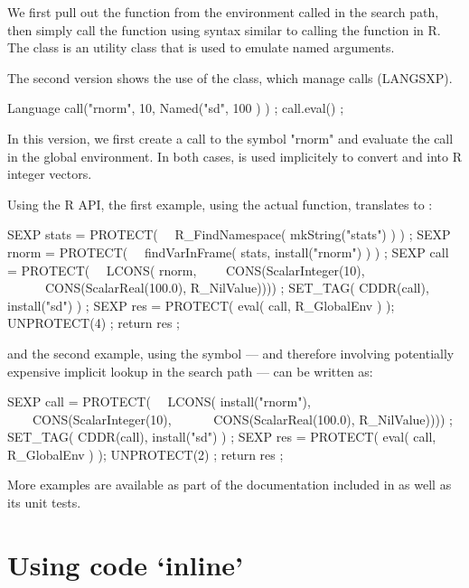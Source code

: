 We first pull out the  function from the environment 
called  in the search path, then simply call the function 
using syntax similar to calling the function in R. The  
class is an utility class that is used to emulate named arguments.

The second version shows the use of the  class, which 
manage calls (LANGSXP). 

\begin{example}
Language call("rnorm", 10, Named("sd", 100 ) ) ;
call.eval() ;
\end{example}

In this version, we first create a call to the symbol "rnorm" and
evaluate the call in the global environment. In both cases, 
is used implicitely to convert  and  
into R integer vectors. 

Using the R API, the first example, using the actual  function,
translates to :

\begin{example}
SEXP stats = PROTECT( 
\ \ R_FindNamespace( mkString("stats") ) ) ;
SEXP rnorm = PROTECT( 
\ \ findVarInFrame( stats, install("rnorm") ) ) ;
SEXP call  = PROTECT( 
\ \ LCONS( rnorm, 
\ \ \ \ CONS(ScalarInteger(10), 
\ \ \ \ \ \ CONS(ScalarReal(100.0), R_NilValue)))) ;
SET_TAG( CDDR(call), install("sd") ) ;
SEXP res = PROTECT( eval( call, R_GlobalEnv ) );
UNPROTECT(4) ;
return res ;
\end{example}

and the second example, using the  symbol --- and therefore
involving potentially expensive implicit lookup in the search path ---
can be written as:

\begin{example}
SEXP call  = PROTECT( 
\ \ LCONS( install("rnorm"), 
\ \ \ \ CONS(ScalarInteger(10), 
\ \ \ \ \ \ CONS(ScalarReal(100.0), R_NilValue)))) ;
SET_TAG( CDDR(call), install("sd") ) ;
SEXP res = PROTECT( eval( call, R_GlobalEnv ) );
UNPROTECT(2) ;
return res ;
\end{example}

More examples are available as part of the documentation
included in  as well as its unit tests.

\section{Using code `inline'}
\label{sec:inline}

